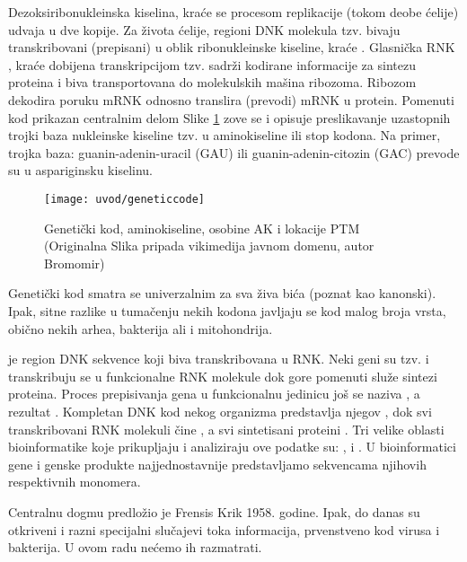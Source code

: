 Dezoksiribonukleinska kiselina, kraće  se procesom replikacije
(tokom deobe ćelije) udvaja u dve kopije. Za života ćelije, regioni DNK
molekula tzv.  bivaju transkribovani (prepisani) u oblik
ribonukleinske kiseline, kraće . Glasnička RNK , kraće 
dobijena transkripcijom tzv.  sadrži kodirane informacije
za sintezu proteina i biva transportovana do molekulskih mašina ribozoma.
Ribozom dekodira poruku mRNK odnosno translira (prevodi) mRNK  u protein.
Pomenuti kod prikazan centralnim delom Slike \ref{fig:kod} zove se
 i opisuje preslikavanje uzastopnih trojki baza nukleinske
kiseline tzv.  u aminokiseline ili stop kodona. Na primer,
trojka baza: guanin-adenin-uracil (GAU) ili guanin-adenin-citozin (GAC) prevode
su u aspariginsku kiselinu.

\begin{figure}[]
\centering
\hspace*{-2.5cm} 
\texttt{[image: uvod/geneticcode]}
\caption { Genetički kod, aminokiseline, osobine AK i lokacije PTM\\
  \footnotesize
(Originalna Slika pripada vikimedija javnom domenu, autor Bromomir)}
\label{fig:kod}
\end{figure}

\clearpage

Genetički kod smatra se univerzalnim za sva živa bića (poznat kao kanonski).
Ipak, sitne razlike u tumačenju nekih kodona javljaju se kod malog broja vrsta,
obično nekih arhea, bakterija ali i mitohondrija.

 je region DNK sekvence
koji biva transkribovana u RNK.  Neki geni su tzv.   i
transkribuju se u funkcionalne RNK molekule dok gore pomenuti 
služe sintezi proteina.  Proces prepisivanja gena u funkcionalnu jedinicu još
se naziva , a rezultat .
Kompletan DNK kod nekog organizma predstavlja njegov
, dok  svi transkribovani RNK molekuli čine ,
a svi sintetisani proteini .  Tri velike oblasti
bioinformatike koje prikupljaju i analiziraju ove podatke su:
,  i .
U bioinformatici gene i genske produkte najjednostavnije predstavljamo
sekvencama njihovih respektivnih monomera.


Centralnu dogmu predložio je Frensis Krik 1958. godine. Ipak, do danas su
otkriveni i razni specijalni slučajevi toka informacija, prvenstveno kod virusa
i bakterija. U ovom radu nećemo ih razmatrati.

